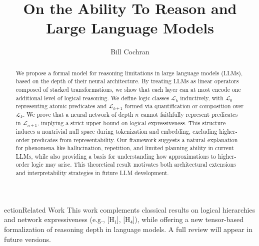 \documentclass[12pt]{article}
\theoremstyle{plain}
\begin{document}
\title{On the Ability To Reason and Large Language Models}
\author{Bill Cochran}
\maketitle

\begin{abstract}
We propose a formal model for reasoning limitations in large language 
models (LLMs), based on the depth of their neural architecture. By 
treating LLMs as linear operators composed of stacked transformations, 
we show that each layer can at most encode one additional level of 
logical reasoning. We define logic classes $\mathcal{L}_k$ inductively, 
with $\mathcal{L}_0$ representing atomic predicates and 
$\mathcal{L}_{k+1}$ formed via quantification or composition over 
$\mathcal{L}_k$. We prove that a neural network of depth $n$ cannot 
faithfully represent predicates in $\mathcal{L}_{n+1}$, implying a 
strict upper bound on logical expressiveness. This structure induces 
a nontrivial null space during tokenization and embedding, excluding 
higher-order predicates from representability. Our framework suggests 
a natural explanation for phenomena like hallucination, repetition, and 
limited planning ability in current LLMs, while also providing a basis 
for understanding how approximations to higher-order logic may arise. 
This theoretical result motivates both architectural extensions and 
interpretability strategies in future LLM development.
\end{abstract}


ection{Related Work}
This work complements classical results on logical hierarchies and network expressiveness (e.g., [H₁], [H₄]), while offering a new tensor-based formalization of reasoning depth in language models. A full review will appear in future versions.
\end{document}
